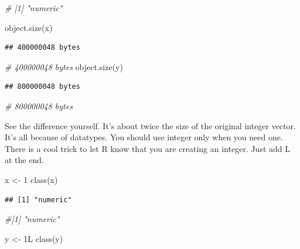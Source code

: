 \documentclass[
]{book}
\newenvironment{Shaded}{\begin{snugshade}}{\end{snugshade}}
\newcommand{\CommentTok}[1]{\textcolor[rgb]{0.56,0.35,0.01}{\textit{#1}}}
\newcommand{\DecValTok}[1]{\textcolor[rgb]{0.00,0.00,0.81}{#1}}
\newcommand{\FunctionTok}[1]{\textcolor[rgb]{0.00,0.00,0.00}{#1}}
\newcommand{\NormalTok}[1]{#1}
\newcommand{\OtherTok}[1]{\textcolor[rgb]{0.56,0.35,0.01}{#1}}
\begin{document}
\begin{Shaded}
\begin{Highlighting}[]
\CommentTok{\# [1] "numeric"}

\FunctionTok{object.size}\NormalTok{(x)}
\end{Highlighting}
\end{Shaded}

\begin{verbatim}
## 400000048 bytes
\end{verbatim}

\begin{Shaded}
\begin{Highlighting}[]
\CommentTok{\# 400000048 bytes}
\FunctionTok{object.size}\NormalTok{(y)}
\end{Highlighting}
\end{Shaded}

\begin{verbatim}
## 800000048 bytes
\end{verbatim}

\begin{Shaded}
\begin{Highlighting}[]
\CommentTok{\# 800000048 bytes}
\end{Highlighting}
\end{Shaded}

See the difference yourself. It's about twice the size of the original integer vector. It's all because of datatypes. You should use integer only when you need one. There is a cool trick to let R know that you are creating an integer. Just add L at the end.

\begin{Shaded}
\begin{Highlighting}[]
\NormalTok{x }\OtherTok{\textless{}{-}} \DecValTok{1}
\FunctionTok{class}\NormalTok{(x)}
\end{Highlighting}
\end{Shaded}

\begin{verbatim}
## [1] "numeric"
\end{verbatim}

\begin{Shaded}
\begin{Highlighting}[]
\CommentTok{\#[1] "numeric"}

\NormalTok{y }\OtherTok{\textless{}{-}}\NormalTok{ 1L}
\FunctionTok{class}\NormalTok{(y)}
\end{Highlighting}
\end{Shaded}
\end{document}
